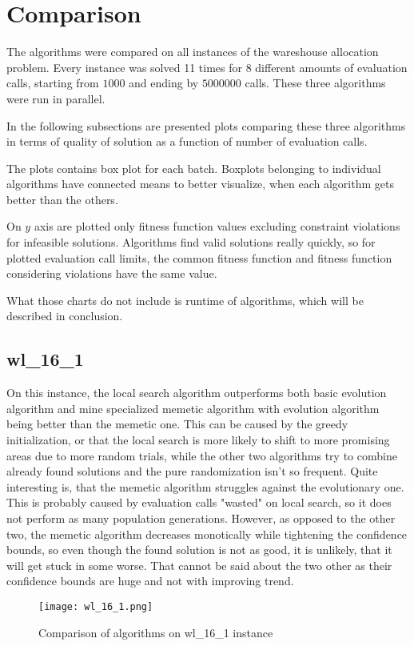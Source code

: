 \documentclass[./main.tex]{subfiles}
\begin{document}
\section{Comparison}

The algorithms were compared on all instances of the wareshouse allocation problem.
Every instance was solved 11 times for 8 different amounts of evaluation calls, starting from $1000$ and ending by $5000000$ calls.
These three algorithms were run in parallel.

In the following subsections are presented plots comparing these three algorithms in terms of quality of solution as a function of number of evaluation calls.

The plots contains box plot for each batch. Boxplots belonging to individual algorithms have connected means to better visualize, when each algorithm gets better than the others.

On $y$ axis are plotted only fitness function values excluding constraint violations for infeasible solutions.
Algorithms find valid solutions really quickly, so for plotted evaluation call limits, the common fitness function and fitness function considering violations have the same value.

What those charts do not include is runtime of algorithms, which will be described in conclusion.

\newpage
\subsection{wl\_16\_1}
On this instance, the local search algorithm outperforms both basic evolution algorithm and mine specialized memetic algorithm with evolution algorithm being better than the memetic one.
This can be caused by the greedy initialization, or that the local search is more likely to shift to more promising areas due to more random trials, while the other two algorithms try to combine already found solutions and the pure randomization isn't so frequent.
Quite interesting is, that the memetic algorithm struggles against the evolutionary one.
This is probably caused by evaluation calls "wasted" on local search, so it does not perform as many population generations.
However, as opposed to the other two, the memetic algorithm decreases monotically while tightening the confidence bounds, so even though the found solution is not as good, it is unlikely, that it will get stuck in some worse.
That cannot be said about the two other as their confidence bounds are huge and not with improving trend.
\begin{figure}[ht]
    \centering
    \texttt{[image: wl\_16\_1.png]}
    \caption{Comparison of algorithms on wl\_16\_1 instance}
\end{figure}
\end{document}

